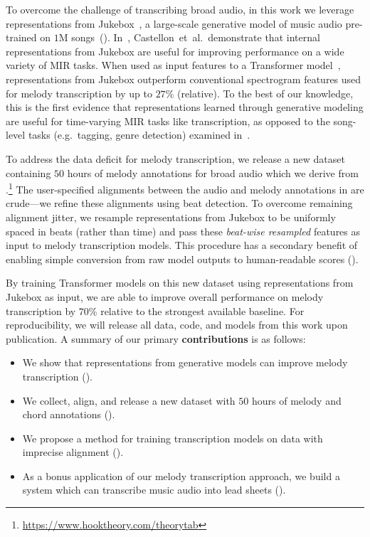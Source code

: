 To overcome the challenge of transcribing broad audio, in this work we leverage representations from Jukebox~\cite{dhariwal2020jukebox}, a large-scale generative model of music audio pre-trained on $1$M songs~(). 
In~\cite{castellon2021calm}, Castellon~et~al.\ demonstrate that internal representations from Jukebox are useful for improving performance on a wide variety of MIR tasks. 
When used as input features to a Transformer model~\cite{vaswani2017attention}, representations from Jukebox outperform conventional spectrogram features used for melody transcription by 
up to $27$\% (relative). 
To the best of our knowledge, this is the first evidence that representations learned through generative modeling are useful for time-varying MIR tasks like transcription, as opposed to the song-level tasks (e.g.~tagging, genre detection) examined in~\cite{castellon2021calm}.

To address the data deficit for melody transcription, 
we release a new dataset containing $50$ hours of melody annotations for broad audio 
which we derive 
from \hooktheory.\footnote{\url{https://www.hooktheory.com/theorytab}} 
The user-specified alignments between the audio and melody annotations in \hooktheory{} are crude---we refine these alignments using beat detection. 
To overcome remaining alignment jitter, we resample representations from Jukebox to be uniformly spaced in beats (rather than time) and pass these \emph{beat-wise resampled} features as input to melody transcription models. 
This procedure 
has a secondary benefit of enabling simple conversion from raw model outputs to human-readable scores ().

By training Transformer models on this new dataset using representations from Jukebox as input, we are able to improve overall performance on melody transcription by 
$70$\% relative 
to the strongest available baseline. 
For reproducibility, we will release all data, code, and models from this work upon publication.
A summary of our primary \textbf{contributions} is as follows:
\begin{itemize}
    \item We show that representations from generative models can improve melody transcription ().
    \item We collect, align, and release a new dataset with $50$ hours of melody and chord annotations ().
    \item We propose a method for training transcription models on data with imprecise alignment ().
    \item As a bonus application of our melody transcription approach, we build a system which can transcribe music audio into lead sheets ().
\end{itemize}